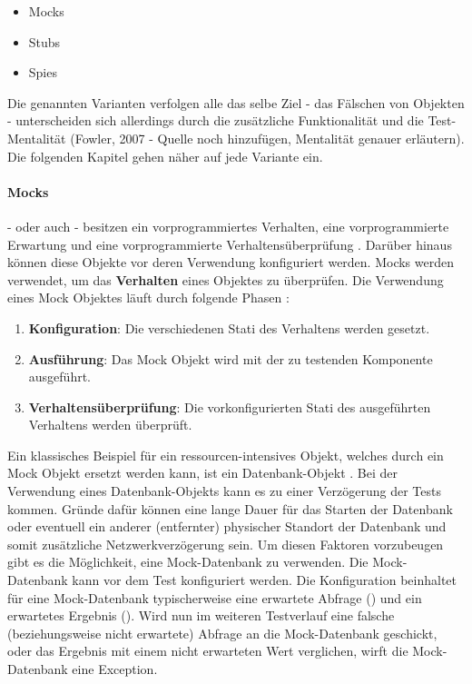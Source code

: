 {\begin{itemize}
  \item Mocks
  \item Stubs
  \item Spies
\end{itemize}

Die genannten Varianten verfolgen alle das selbe Ziel - das Fälschen von Objekten - unterscheiden sich allerdings durch die zusätzliche Funktionalität und die Test-Mentalität (Fowler, 2007 - Quelle noch hinzufügen, Mentalität genauer erläutern). Die folgenden Kapitel gehen näher auf jede Variante ein.

\paragraph{Mocks}
 - oder auch  - besitzen ein vorprogrammiertes Verhalten, eine vorprogrammierte Erwartung und eine vorprogrammierte Verhaltensüberprüfung \autocite[453]{Johansen:2011}. Darüber hinaus können diese Objekte vor deren Verwendung konfiguriert werden. Mocks werden verwendet, um das \textbf{Verhalten} eines Objektes zu überprüfen. Die Verwendung eines Mock Objektes läuft durch folgende Phasen \autocite[453]{Johansen:2011}:
\begin{enumerate}
  \item \textbf{Konfiguration}: \newline
  Die verschiedenen Stati des Verhaltens werden gesetzt.
  \item \textbf{Ausführung}: \newline
  Das Mock Objekt wird mit der zu testenden Komponente ausgeführt.
  \item \textbf{Verhaltensüberprüfung}: \newline
  Die vorkonfigurierten Stati des ausgeführten Verhaltens werden überprüft.
\end{enumerate}

Ein klassisches Beispiel für ein ressourcen-intensives Objekt, welches durch ein Mock Objekt ersetzt werden kann, ist ein Datenbank-Objekt \autocite[144]{Beck:2003}. Bei der Verwendung eines Datenbank-Objekts kann es zu einer Verzögerung der Tests kommen. Gründe dafür können eine lange Dauer für das Starten der Datenbank oder eventuell ein anderer (entfernter) physischer Standort der Datenbank und somit zusätzliche Netzwerkverzögerung sein. Um diesen Faktoren vorzubeugen gibt es die Möglichkeit, eine Mock-Datenbank zu verwenden. Die Mock-Datenbank kann vor dem Test konfiguriert werden. Die Konfiguration beinhaltet für eine Mock-Datenbank typischerweise eine erwartete Abfrage () und ein erwartetes Ergebnis (). Wird nun im weiteren Testverlauf eine falsche (beziehungsweise nicht erwartete) Abfrage an die Mock-Datenbank geschickt, oder das Ergebnis mit einem nicht erwarteten Wert verglichen, wirft die Mock-Datenbank eine Exception.

}
